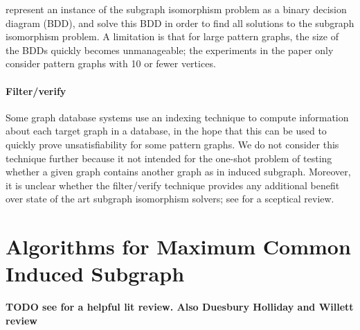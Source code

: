 \citet{DBLP:conf/RelMiCS/CortadellaV00} represent an instance of the subgraph
isomorphism problem as a binary decision diagram (BDD), and solve this BDD
in order to find all solutions to the subgraph isomorphism problem.  A limitation
is that for large
pattern graphs, the size of the BDDs quickly becomes unmanageable; the experiments
in the paper only consider pattern graphs with 10 or fewer vertices.

\paragraph*{Filter/verify} Some graph database systems use an indexing
technique to compute information about each target graph in a database, in the
hope that this can be used to quickly prove unsatisfiability for some pattern
graphs.  We do not consider this technique further because it not intended for
the one-shot problem of testing whether a given graph contains another graph as
in induced subgraph.  Moreover, it is unclear whether the filter/verify
technique provides any additional benefit over state of the art subgraph
isomorphism solvers; see \citet{DBLP:journals/jair/McCreeshPST18} for a
sceptical review.


\section{Algorithms for Maximum Common Induced Subgraph}\label{sec:mcs-algorithms}

\textbf{TODO see \citet{DBLP:journals/jcamd/RaymondW02a} for a helpful lit review.
Also Duesbury Holliday and Willett review}

